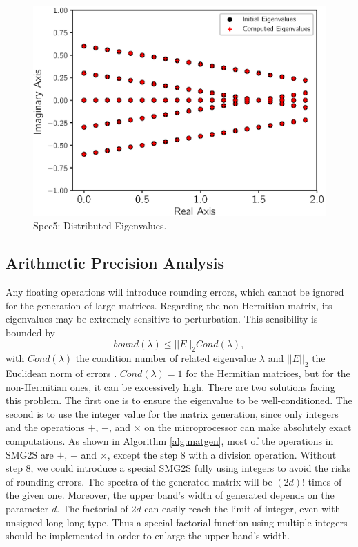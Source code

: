 \begin{figure}[htbp]
	\centering
	\includegraphics[width=5.8in]{fig/matgen/vector4.eps}
	\caption{Spec5: Distributed Eigenvalues.}
	\label{fig_fifth_case}
\end{figure}

\subsection{Arithmetic Precision Analysis}

Any floating operations will introduce rounding errors, which cannot be ignored for the generation of large matrices. Regarding the non-Hermitian matrix, its eigenvalues may be extremely sensitive to perturbation. This sensibility is bounded by \[bound(\lambda) \leq ||E||_2Cond(\lambda),\] with $Cond(\lambda)$ the condition number of related eigenvalue $\lambda$ and $||E||_2$ the Euclidean norm of errors \cite{saad2011numerical}. $Cond(\lambda)=1$ for the Hermitian matrices, but for the non-Hermitian ones, it can be excessively high. There are two solutions facing this problem. The first one is to ensure the eigenvalue to be well-conditioned. The second is to use the integer value for the matrix generation, since only integers and the operations $+$, $-$, and $\times$ on the microprocessor can make absolutely exact computations. As shown in Algorithm \ref{alg:matgen}, most of the operations in SMG2S are $+$, $-$ and $\times$, except the step 8 with a division operation. Without step 8, we could introduce a special SMG2S fully using integers to avoid the risks of rounding errors. The spectra of the generated matrix will be $(2d)!$ times of the given one. Moreover, the upper band's width of generated depends on the parameter $d$. The factorial of $2d$ can easily reach the limit of integer, even with unsigned long long type. Thus a special factorial function using multiple integers should be implemented in order to enlarge the upper band's width.

